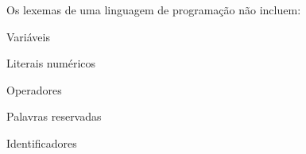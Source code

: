 \question[10]

Os lexemas de uma linguagem de programação não incluem:

\begin{choices}
\item Variáveis %
\item Literais numéricos
\item Operadores
\item Palavras reservadas
\item Identificadores
\end{choices}
\answerline
